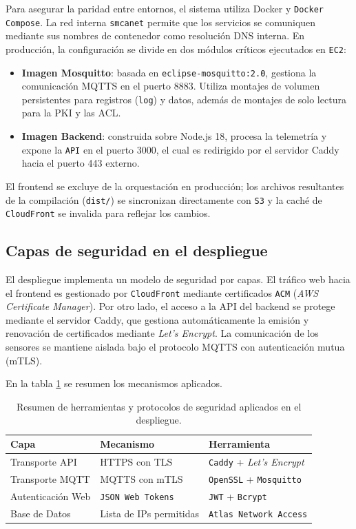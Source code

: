 Para asegurar la paridad entre entornos, el sistema utiliza Docker y \texttt{Docker Compose}. La red interna \texttt{smca\textunderscore net} permite que los servicios se comuniquen mediante sus nombres de contenedor como resolución DNS interna. En producción, la configuración se divide en dos módulos críticos ejecutados en \texttt{EC2}:

\begin{itemize}
    \item \textbf{Imagen Mosquitto}: basada en \texttt{eclipse-mosquitto:2.0}, gestiona la comunicación MQTTS en el puerto 8883. Utiliza montajes de volumen persistentes para registros (\texttt{log}) y datos, además de montajes de solo lectura para la PKI y las ACL.
    \item \textbf{Imagen Backend}: construida sobre Node.js 18, procesa la telemetría y expone la \texttt{API} en el puerto 3000, el cual es redirigido por el servidor Caddy hacia el puerto 443 externo.
\end{itemize}

El frontend se excluye de la orquestación en producción; los archivos resultantes de la compilación (\texttt{dist/}) se sincronizan directamente con \texttt{S3} y la caché de \texttt{CloudFront} se invalida para reflejar los cambios.

\subsection{Capas de seguridad en el despliegue}

El despliegue implementa un modelo de seguridad por capas. El tráfico web hacia el frontend es gestionado por \texttt{CloudFront} mediante certificados \texttt{ACM} (\textit{AWS Certificate Manager}). Por otro lado, el acceso a la API del backend se protege mediante el servidor Caddy, que gestiona automáticamente la emisión y renovación de certificados mediante \textit{Let's Encrypt}. La comunicación de los sensores se mantiene aislada bajo el protocolo MQTTS con autenticación mutua (mTLS).

En la tabla \ref{tab:seguridad-capas} se resumen los mecanismos aplicados.

\begin{table}[h]
    \centering
    \caption[Mecanismos de seguridad por capa]{Resumen de herramientas y protocolos de seguridad aplicados en el despliegue.}
    \label{tab:seguridad-capas}
    \begin{tabular}{p{4cm} p{4.5cm} p{3.5cm}}
        \toprule
        \textbf{Capa} & \textbf{Mecanismo} & \textbf{Herramienta} \\
        \midrule
        Transporte API & HTTPS con TLS & \texttt{Caddy} + \textit{Let's Encrypt} \\
        Transporte MQTT & MQTTS con mTLS & \texttt{OpenSSL} + \texttt{Mosquitto} \\
        Autenticación Web & \texttt{JSON Web Tokens} & \texttt{JWT} + \texttt{Bcrypt} \\
        Base de Datos & Lista de IPs permitidas & \texttt{Atlas Network Access} \\
        \bottomrule
    \end{tabular}
\end{table}

